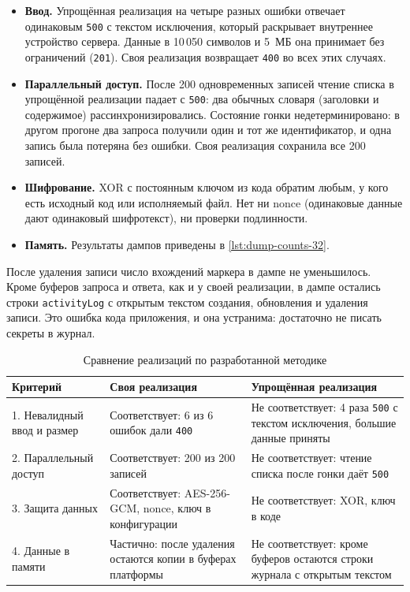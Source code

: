 \begin{itemize}
  \item \textbf{Ввод.} Упрощённая реализация на четыре разных ошибки
  отвечает одинаковым \texttt{500} с текстом исключения, который раскрывает
  внутреннее устройство сервера. Данные в 10\,050 символов и 5~МБ она
  принимает без ограничений (\texttt{201}). Своя реализация возвращает
  \texttt{400} во всех этих случаях.
  \item \textbf{Параллельный доступ.} После 200 одновременных записей
  чтение списка в упрощённой реализации падает с \texttt{500}: два
  обычных словаря (заголовки и содержимое) рассинхронизировались.
  Состояние гонки недетерминировано: в другом прогоне два запроса
  получили один и тот же идентификатор, и одна запись была потеряна без
  ошибки. Своя реализация сохранила все 200 записей.
  \item \textbf{Шифрование.} XOR с постоянным ключом из кода
  обратим любым, у кого есть исходный код или исполняемый файл. Нет ни
  nonce (одинаковые данные дают одинаковый шифротекст), ни проверки
  подлинности.
  \item \textbf{Память.} Результаты дампов приведены в
  \autoref{lst:dump-counts-32}.
\end{itemize}


После удаления записи число вхождений маркера в дампе не уменьшилось. Кроме
буферов запроса и ответа, как и у своей реализации, в дампе остались
строки \texttt{activityLog} с открытым текстом создания, обновления и
удаления записи. Это ошибка кода приложения, и она устранима: достаточно
не писать секреты в журнал.


\begin{table}[H]
\centering
\small
\begin{tabular}{|p{4.5cm}|p{5cm}|p{5cm}|}
\hline
\textbf{Критерий} & \textbf{Своя реализация} & \textbf{Упрощённая реализация} \\
\hline
1. Невалидный ввод и размер & Соответствует: 6 из 6 ошибок дали \texttt{400} & Не соответствует: 4 раза \texttt{500} с текстом исключения, большие данные приняты \\
\hline
2. Параллельный доступ & Соответствует: 200 из 200 записей & Не соответствует: чтение списка после гонки даёт \texttt{500} \\
\hline
3. Защита данных & Соответствует: AES-256-GCM, nonce, ключ в конфигурации & Не соответствует: XOR, ключ в коде \\
\hline
4. Данные в памяти & Частично: после удаления остаются копии в буферах платформы & Не соответствует: кроме буферов остаются строки журнала с открытым текстом \\
\hline
\end{tabular}
\caption{Сравнение реализаций по разработанной методике}
\label{tab:compare}
\end{table}

